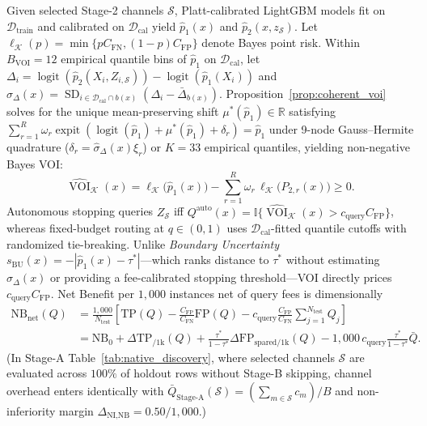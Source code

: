 \documentclass[11pt]{article}
\theoremstyle{remark}
\begin{document}
Given selected Stage-2 channels $\mathcal{S}$, Platt-calibrated LightGBM models fit on $\mathcal{D}_{\text{train}}$ and calibrated on $\mathcal{D}_{\text{cal}}$ yield $\hat{p}_1(x)$ and $\hat{p}_2(x, z_{\mathcal{S}})$. Let $\ell_{\mathcal{K}}(p) = \min\{p C_{\text{FN}}, (1-p)C_{\text{FP}}\}$ denote Bayes point risk. Within $B_{\text{VOI}} = 12$ empirical quantile bins of $\hat{p}_1$ on $\mathcal{D}_{\text{cal}}$, let $\Delta_i = \operatorname{logit}(\hat{p}_2(X_i, Z_{i,\mathcal{S}})) - \operatorname{logit}(\hat{p}_1(X_i))$ and $\hat{\sigma}_{\Delta}(x) = \operatorname{SD}_{i \in \mathcal{D}_{\text{cal}} \cap b(x)}(\Delta_i - \bar{\Delta}_{b(x)})$. Proposition~\ref{prop:coherent_voi} solves for the unique mean-preserving shift $\mu^*(\hat{p}_1) \in \mathbb{R}$ satisfying $\sum_{r=1}^R \omega_r \operatorname{expit}(\operatorname{logit}(\hat{p}_1) + \mu^*(\hat{p}_1) + \delta_r) = \hat{p}_1$ under 9-node Gauss--Hermite quadrature ($\delta_r = \hat{\sigma}_{\Delta}(x)\xi_r$) or $K = 33$ empirical quantiles, yielding non-negative Bayes VOI:
\begin{equation}
  \widehat{\operatorname{VOI}}_{\mathcal{K}}(x) = \ell_{\mathcal{K}}\!\big(\hat{p}_1(x)\big) - \sum_{r=1}^R \omega_r \, \ell_{\mathcal{K}}\!\big(P_{2,r}(x)\big) \ge 0.
  \label{eq:voi}
\end{equation}
Autonomous stopping queries $Z_{\mathcal{S}}$ iff $Q^{\text{auto}}(x) = \mathbb{I}\{\widehat{\operatorname{VOI}}_{\mathcal{K}}(x) > c_{\text{query}} C_{\text{FP}}\}$, whereas fixed-budget routing at $q \in (0, 1)$ uses $\mathcal{D}_{\text{cal}}$-fitted quantile cutoffs with randomized tie-breaking. Unlike \emph{Boundary Uncertainty} $s_{\text{BU}}(x) = -|\hat{p}_1(x) - \tau^*|$---which ranks distance to $\tau^*$ without estimating $\hat{\sigma}_{\Delta}(x)$ or providing a fee-calibrated stopping threshold---VOI directly prices $c_{\text{query}} C_{\text{FP}}$. Net Benefit per $1{,}000$ instances net of query fees \citep{vickers2006decision} is dimensionally
\begin{equation}
  \begin{aligned}
    \text{NB}_{\text{net}}(Q) &= \frac{1{,}000}{N_{\text{test}}}\left[\text{TP}(Q) - \frac{C_{\text{FP}}}{C_{\text{FN}}}\text{FP}(Q) - c_{\text{query}}\frac{C_{\text{FP}}}{C_{\text{FN}}}\sum_{j=1}^{N_{\text{test}}} Q_j\right] \\
    &= \text{NB}_0 + \Delta\text{TP}_{/1\text{k}}(Q) + \frac{\tau^*}{1-\tau^*}\Delta\text{FP}_{\text{spared}/1\text{k}}(Q) - 1{,}000\, c_{\text{query}}\frac{\tau^*}{1-\tau^*}\bar{Q}.
  \end{aligned}
  \label{eq:net_benefit}
\end{equation}
(In Stage-A Table~\ref{tab:native_discovery}, where selected channels $\mathcal{S}$ are evaluated across $100\%$ of holdout rows without Stage-B skipping, channel overhead enters identically with $\bar{Q}_{\text{Stage-A}}(\mathcal{S}) = (\sum_{m \in \mathcal{S}} c_m)/B$ and non-inferiority margin $\Delta_{\text{NI,NB}} = 0.50/1{,}000$.)
\end{document}
